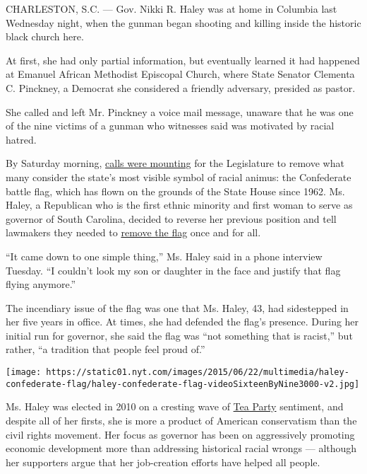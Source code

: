 CHARLESTON, S.C. --- Gov. Nikki R. Haley was at home in Columbia last
Wednesday night, when the gunman began shooting and killing inside the
historic black church here.

At first, she had only partial information, but eventually learned it
had happened at Emanuel African Methodist Episcopal Church, where State
Senator Clementa C. Pinckney, a Democrat she considered a friendly
adversary, presided as pastor.

She called and left Mr. Pinckney a voice mail message, unaware that he
was one of the nine victims of a gunman who witnesses said was motivated
by racial hatred.

By Saturday morning,
\href{http://www.nytimes.com/2015/06/23/us/south-carolina-confederate-flag-dylann-roof.html}{calls
were mounting} for the Legislature to remove what many consider the
state's most visible symbol of racial animus: the Confederate battle
flag, which has flown on the grounds of the State House since 1962. Ms.
Haley, a Republican who is the first ethnic minority and first woman to
serve as governor of South Carolina, decided to reverse her previous
position and tell lawmakers they needed to
\href{http://www.nytimes.com/interactive/2015/06/22/us/Transcript-Gov-Nikki-R-Haley-of-South-Carolina-Addresses-Removing-the-Confederate-Battle-Flag.html}{remove
the flag} once and for all.

``It came down to one simple thing,'' Ms. Haley said in a phone
interview Tuesday. ``I couldn't look my son or daughter in the face and
justify that flag flying anymore.''

The incendiary issue of the flag was one that Ms. Haley, 43, had
sidestepped in her five years in office. At times, she had defended the
flag's presence. During her initial run for governor, she said the flag
was ``not something that is racist,'' but rather, ``a tradition that
people feel proud of.''

\texttt{[image: https://static01.nyt.com/images/2015/06/22/multimedia/haley-confederate-flag/haley-confederate-flag-videoSixteenByNine3000-v2.jpg]}

Ms. Haley was elected in 2010 on a cresting wave of
\href{http://topics.nytimes.com/top/reference/timestopics/subjects/t/tea_party_movement/index.html?inline=nyt-classifier}{Tea
Party} sentiment, and despite all of her firsts, she is more a product
of American conservatism than the civil rights movement. Her focus as
governor has been on aggressively promoting economic development more
than addressing historical racial wrongs --- although her supporters
argue that her job-creation efforts have helped all people.

